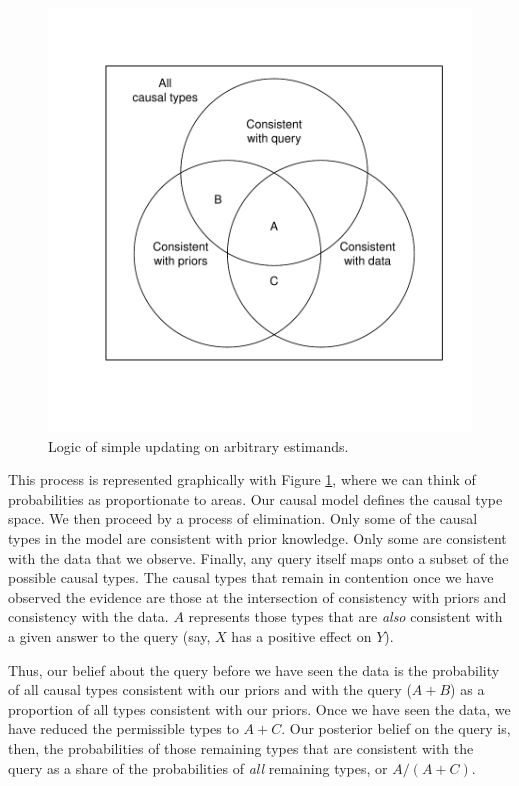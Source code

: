 \documentclass[12pt,]{book}
\begin{document}
\begin{figure}
\centering
\includegraphics{ii_files/figure-latex/ptvenn-1.pdf}
\caption{\label{fig:ptvenn}Logic of simple updating on arbitrary estimands.}
\end{figure}

This process is represented graphically with Figure \ref{fig:ptvenn}, where we can think of probabilities as proportionate to areas. Our causal model defines the causal type space. We then proceed by a process of elimination. Only some of the causal types in the model are consistent with prior knowledge. Only some are consistent with the data that we observe. Finally, any query itself maps onto a subset of the possible causal types. The causal types that remain in contention once we have observed the evidence are those at the intersection of consistency with priors and consistency with the data. \(A\) represents those types that are \emph{also} consistent with a given answer to the query (say, \(X\) has a positive effect on \(Y\)).

Thus, our belief about the query before we have seen the data is the probability of all causal types consistent with our priors and with the query (\(A + B\)) as a proportion of all types consistent with our priors. Once we have seen the data, we have reduced the permissible types to \(A + C\). Our posterior belief on the query is, then, the probabilities of those remaining types that are consistent with the query as a share of the probabilities of \emph{all} remaining types, or \(A/(A+C)\).
\end{document}
